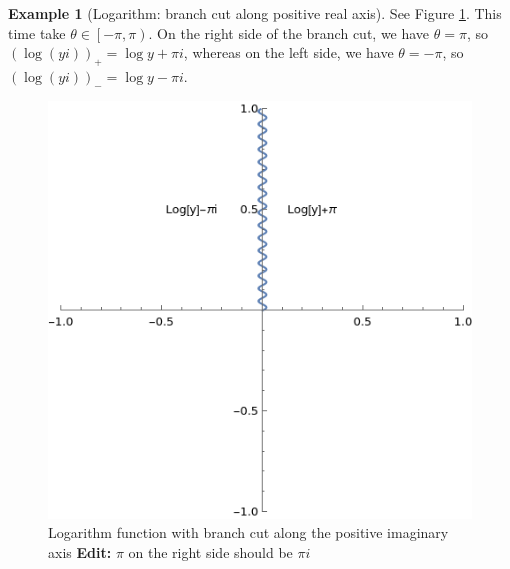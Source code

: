 \documentclass[a4paper, 12pt]{article}
\theoremstyle{definition}
\newtheorem{example}{Example}
\numberwithin{theorem}{section}
\numberwithin{definition}{section}
\numberwithin{exercise}{section}
\numberwithin{remark}{section}
\numberwithin{figure}{section}
\numberwithin{example}{section}
\begin{document}
\begin{example}[Logarithm: branch cut along positive real axis]
    See Figure \ref{fig: Log Positive Imaginary}.
    This time take $\theta \in \left[ -\pi, \pi \right)$.
    On the right side of the branch cut, we have $\theta = \pi$, so
    $\left( \log \left( yi \right) \right)_{+} = \log{y} + \pi i$,
    whereas on the left side, we have $\theta = -\pi$, so
    $\left( \log \left( yi \right) \right)_{-} = \log{y} - \pi i$.

    \begin{figure}[tbp]
        \centering
        \includegraphics{logpositiveimaginary}
        \caption{Logarithm function with branch cut along the positive imaginary axis \textbf{Edit:} $\pi$ on the right side should be $\pi i$}
        \label{fig: Log Positive Imaginary}
    \end{figure}
\end{example}
\end{document}
